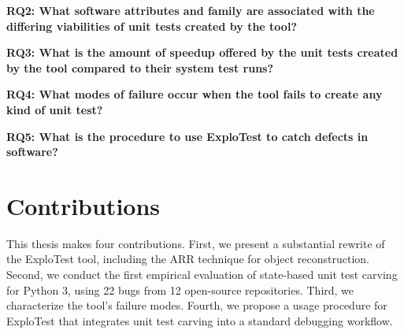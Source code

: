 
\noindent\textbf{RQ2: What software attributes and family are associated with the differing viabilities of unit tests created by the tool?}


\noindent\textbf{RQ3: What is the amount of speedup offered by the unit tests created by the tool compared to their system test runs?}


\noindent\textbf{RQ4: What modes of failure occur when the tool fails to create any kind of unit test?}


\noindent\textbf{RQ5: What is the procedure to use ExploTest to catch defects in software?}


\section{Contributions}

This thesis makes four contributions.
First, we present a substantial rewrite of the ExploTest tool, including the ARR technique for object reconstruction.
Second, we conduct the first empirical evaluation of state-based unit test carving for Python 3,
using 22 bugs from 12 open-source repositories.
Third, we characterize the tool's failure modes.
Fourth, we propose a usage procedure for ExploTest that integrates unit test carving into a standard debugging workflow.
